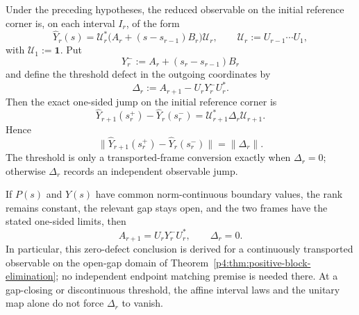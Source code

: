 \documentclass[12pt,a4paper]{article}
\begin{document}
\begin{proposition}
\label{p4:prop:piecewise-affine-threshold-composition}
Under the preceding hypotheses, the reduced observable on the initial
reference corner is, on each interval \(I_r\), of the form
\begin{equation}
\label{p4:eq:global-piecewise-affine-law}
\widehat Y_r(s)
=
\mathcal U_r^*\bigl(A_r+(s-s_{r-1})B_r\bigr)\mathcal U_r,
\qquad
\mathcal U_r:=U_{r-1}\cdots U_1,
\end{equation}
with \(\mathcal U_1:=\mathbf 1\).  Put
\begin{equation}
\label{p4:eq:threshold-incoming-value}
Y_r^-:=A_r+(s_r-s_{r-1})B_r
\end{equation}
and define the threshold defect in the outgoing coordinates by
\begin{equation}
\label{p4:eq:threshold-jump-defect}
\boxed{\;
\Delta_r:=A_{r+1}-U_rY_r^-U_r^* .
\;}
\end{equation}
Then the exact one-sided jump on the initial reference corner is
\begin{equation}
\label{p4:eq:threshold-boundary-conjugation}
\boxed{\;
\widehat Y_{r+1}(s_r^+)-\widehat Y_r(s_r^-)
=\mathcal U_{r+1}^*\Delta_r\mathcal U_{r+1}.
\;}
\end{equation}
Hence
\[
\|\widehat Y_{r+1}(s_r^+)-\widehat Y_r(s_r^-)\|
=\|\Delta_r\|.
\]
The threshold is only a transported-frame conversion exactly when
\(\Delta_r=0\); otherwise \(\Delta_r\) records an independent observable
jump.

If \(P(s)\) and \(Y(s)\) have common norm-continuous boundary values, the
rank remains constant, the relevant gap stays open, and the two frames have
the stated one-sided limits, then
\[
A_{r+1}=U_rY_r^-U_r^*,
\qquad
\Delta_r=0.
\]
In particular, this zero-defect conclusion is derived for a continuously
transported observable on the open-gap domain of
Theorem~\ref{p4:thm:positive-block-elimination}; no independent endpoint
matching premise is needed there.  At a gap-closing or discontinuous
threshold, the affine interval laws and the unitary map alone do not force
\(\Delta_r\) to vanish.
\end{proposition}
\end{document}
